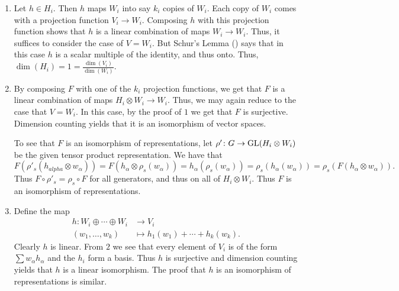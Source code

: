 \documentclass[letterpaper, 11pt, oneside]{book}
\begin{document}
\begin{pf}
  \begin{enumerate}
  \item Let $h \in H_{i}$.
        Then $h$ maps $W_{i}$ into say $k_{i}$ copies of $W_{i}$.
        Each copy of $W_{i}$ comes with a projection function $V_{i} \to W_{i}$.
        Composing $h$ with this projection function shows that $h$ is a linear combination of maps $W_{i} \to W_{i}$.
        Thus, it suffices to consider the case of $V = W_{i}$.
        But Schur's Lemma () says that in this case $h$ is a scalar multiple of the identity, and thus onto.
        Thus, $\dim(H_{i}) = 1 = \frac{\dim(V_{i})}{\dim(W_{i})}$.
  \item By composing $F$ with one of the $k_{i}$ projection functions, we get that $F$ is a linear combination of maps $H_{i} \otimes W_{i} \to W_{i}$.
        Thus, we may again reduce to the case that $V = W_{i}$.
        In this case, by the proof of $1$ we get that $F$ is surjective.
        Dimension counting yields that it is an isomorphism of vector spaces.

        To see that $F$ is an isomorphism of representations, let $\rho'\colon G \to \operatorname{GL}(H_{i} \otimes W_{i})$ be the given tensor product representation.
        We have that
        \[
          F(\rho'_{s}(h_{alpha} \otimes w_{\alpha})) = F(h_{\alpha} \otimes \rho_{s}(w_{\alpha})) = h_{\alpha}(\rho_{s}(w_{\alpha})) = \rho_{s}(h_{\alpha}(w_{\alpha})) = \rho_{s}(F(h_{\alpha} \otimes w_{\alpha})).
        \]
        Thus $F \circ \rho'_{s} = \rho_{s} \circ F$ for all generators, and thus on all of $H_{i} \otimes W_{i}$.
        Thus $F$ is an isomorphism of representations.

  \clearpage

  \item Define the map
        \begin{align*}
          h\colon W_{i} \oplus \cdots \oplus W_{i} &\to V_{i} \\
          (w_{1}, \ldots, w_{k}) &\mapsto h_{1}(w_{1}) + \cdots + h_{k}(w_{k}).
        \end{align*}
        Clearly $h$ is linear.
        From $2$ we see that every element of $V_{i}$ is of the form $\sum w_{\alpha} h_{\alpha}$ and the $h_{i}$ form a basis.
        Thus $h$ is surjective and dimension counting yields that $h$ is a linear isomorphism.
        The proof that $h$ is an isomorphism of representations is similar.


\end{enumerate}
\end{pf}
\end{document}
